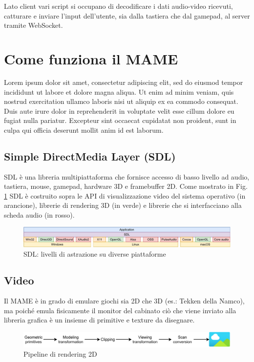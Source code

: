 Lato client vari script si occupano di decodificare i dati audio-video ricevuti, catturare e inviare l'input dell'utente, sia dalla tastiera che dal gamepad, al server tramite WebSocket.



\section{Come funziona il MAME}
Lorem ipsum dolor sit amet, consectetur adipiscing elit, sed do eiusmod tempor incididunt ut labore et dolore magna aliqua. Ut enim ad minim veniam, quis nostrud exercitation ullamco laboris nisi ut aliquip ex ea commodo consequat. Duis aute irure dolor in reprehenderit in voluptate velit esse cillum dolore eu fugiat nulla pariatur. Excepteur sint occaecat cupidatat non proident, sunt in culpa qui officia deserunt mollit anim id est laborum.

\subsection{Simple DirectMedia Layer (SDL)}
SDL è una libreria multipiattaforma che fornisce accesso di basso livello ad audio, tastiera, mouse, gamepad, hardware 3D e framebuffer 2D. Come mostrato in Fig. \ref{fig:sdl} SDL è costruito sopra le API di visualizzazione video del sistema operativo (in arancione), librerie di rendering 3D (in verde) e librerie che si interfacciano alla scheda audio (in rosso)\cite{SDL_Wiki}.

\begin{figure}[H]
	\includegraphics[width=\linewidth]{immagini/sdl}
	\caption{SDL: livelli di astrazione su diverse piattaforme}
	\label{fig:sdl}
\end{figure}

\subsection{Video}
Il MAME è in grado di emulare giochi sia 2D che 3D (es.: Tekken della Namco), ma poiché emula fisicamente il monitor del cabinato ciò che viene inviato alla libreria grafica è un insieme di primitive e texture da disegnare.

\begin{figure}[H]
	\includegraphics[width=\linewidth]{immagini/rendering_pipeline}
	\caption{Pipeline di rendering 2D}
	\label{fig:rendering_pipeline}
\end{figure}

